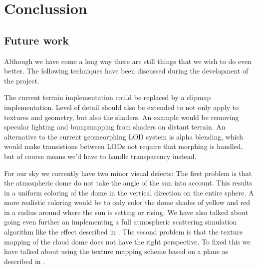 
\chapter{Conclussion}








\section{Future work}
Although we have come a long way there are still things that we wish to
do even better. The following techniques have been discussed during
the development of the project.

The current terrain implementation could be replaced by a clipmap
implementation. Level of detail should also be extended to not only
apply to textures and geometry, but also the shaders. An example would
be removing specular lighting and bumpmapping from shaders on distant
terrain. An alternative to the current geomeorphing LOD system is
alpha blending, which would make transistions between LODs not require
that morphing is handled, but of course means we'd have to handle
transparency instead.

For our sky we corrently have two minor visual defects: The first
problem is that the atmospheric dome do not take the angle of the sun
into account. This results in a uniform coloring of the dome in the
vertical direction on the entire sphere. A more realistic coloring
would be to only color the dome shades of yellow and red in a radius
around where the sun is setting or rising.
%
We have also talked about going even further an implementing a full
atmospheric scattering simulation algorithm like the
effect described in .
%
The second problem is that the texture mapping of the cloud dome does
not have the right perspective.
To fixed this we have talked about using the texture mapping scheme
based on a plane as described in .

